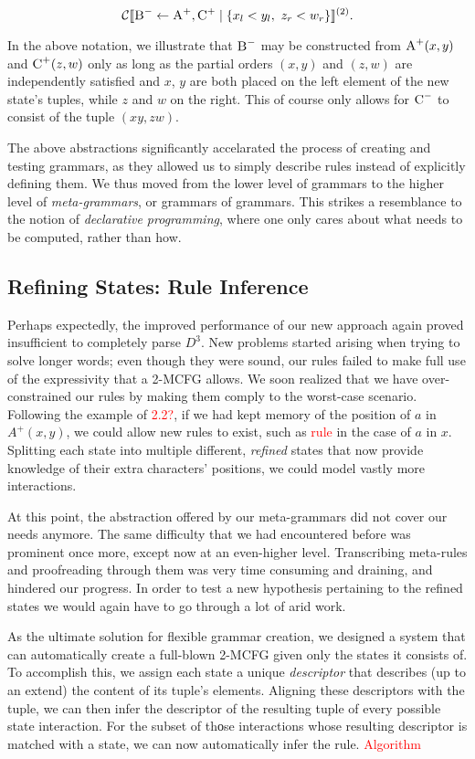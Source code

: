\documentclass[nonatbib,numbers,10pt]{sigplanconf}
\newcommand\todo[1]{\textcolor{red}{#1}}
\newcommand{\Order}[5]{
	\[
	\mathcal{#1}\llbracket #2 \leftarrow #3 \mid \{ #4 \} \rrbracket^{(#5)}.
	\]
}
\newcommand{\Con}[4]{\Order{C}{#1}{#2}{#3}{#4}}
\begin{document}
\Con{\textsc{B}^-}{\textsc{A}^+, \textsc{C}^+}{x_l < y_l,\ z_r < w_r}{2}

In the above notation, we illustrate that $\textsc{B}^{-}$ may be constructed from $\textsc{A}^{+}(x,y)$ and $\textsc{C}^{+}(z,w)$ only as long as the partial orders $(x,y)$ and $(z,w)$ are independently satisfied and $x$, $y$ are both placed on the left element of the new state's tuples, while $z$ and $w$ on the right. This of course only allows for $\textsc{C}^{-}$ to consist of the tuple $(xy, zw)$.

The above abstractions significantly accelarated the process of creating and testing grammars, as they allowed us to simply describe rules instead of explicitly defining them. We thus moved from the lower level of grammars to the higher level of \textit{meta-grammars}, or grammars of grammars. This strikes a resemblance to the notion of \textit{declarative programming}, where one only cares about what needs to be computed, rather than how.

\subsection{Refining States: Rule Inference}
Perhaps expectedly, the improved performance of our new approach again proved insufficient to completely parse $D^3$. New problems started arising when trying to solve longer words; even though they were sound, our rules failed to make full use of the expressivity that a 2-MCFG allows. We soon realized that we have over-constrained our rules by making them comply to the worst-case scenario. Following the example of \todo{2.2?}, if we had kept memory of the position of $a$ in $A^{+}(x,y)$, we could allow new rules to exist, such as \todo{rule} in the case of $a$ in $x$. Splitting each state into multiple different, \textit{refined} states that now provide knowledge of their extra characters' positions, we could model vastly more interactions.

At this point, the abstraction offered by our meta-grammars did not cover our needs anymore. The same difficulty that we had encountered before was prominent once more, except now at an even-higher level. Transcribing meta-rules and proofreading through them was very time consuming and draining, and hindered our progress. In order to test a new hypothesis pertaining to the refined states we would again have to go through a lot of arid work.

As the ultimate solution for flexible grammar creation, we designed a system that can automatically create a full-blown 2-MCFG given only the states it consists of. To accomplish this, we assign each state a unique \textit{descriptor} that describes (up to an extend) the content of its tuple's elements. Aligning these descriptors with the tuple, we can then infer the descriptor of the resulting tuple of every possible state interaction. For the subset of thοse interactions whose resulting descriptor is matched with a state, we can now automatically infer the rule.
\todo{Algorithm}
\end{document}
